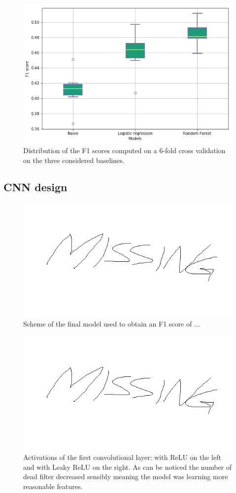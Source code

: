 \documentclass[10pt,conference,compsocconf]{IEEEtran}
\begin{document}
\begin{figure}[tbp]
	\centering
	\includegraphics[width=0.8\columnwidth]{img/boxplots_naive.png}
	\caption{Distribution of the F1 scores computed on a 6-fold cross validation on the three considered baselines.}
	\vspace{-3mm}
	\label{fig:baselines}
\end{figure}

\subsection{CNN design}
\begin{figure}[tbp]
	\centering
	\includegraphics[width=0.8\columnwidth]{img/missing.png}
	\caption{Scheme of the final model used to obtain an F1 score of ... }
	\vspace{-3mm}
	\label{fig:cnn-model}
\end{figure}
\begin{figure}[tbp]
	\centering
	\includegraphics[width=0.8\columnwidth]{img/missing.png}
	\caption{Activations of the first convolutional layer: with ReLU on the left and with Leaky ReLU on the right. As can be noticed the number of dead filter decreased sensibly meaning the model was learning more reasonable features.}
	\vspace{-3mm}
	\label{fig:dead-filters}
\end{figure}
\end{document}
